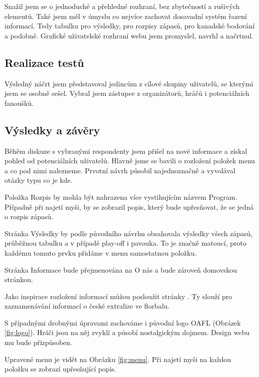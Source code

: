 \documentclass[11pt, a4paper, titlepage]{article}
\begin{document}
Snažil jsem se o jednoduché a přehledné rozhraní, bez zbytečností a rušivých elementů. Také jsem měl v úmyslu co nejvíce zachovat dosavadní systém řazení informací. Tedy tabulku pro výsledky, pro rozpisy zápasů, pro kanadské bodování a podobně. Grafické uživatelské rozhraní webu jsem promyslel, navrhl a načrtnul.

\subsection{Realizace testů}

Výsledný náčrt jsem představoval jedincům z cílové skupiny uživatelů, se kterými jsem se osobně sešel. Vybral jsem zástupce z organizátorů, hráčů i potenciálních fanoušků.

\subsection{Výsledky a závěry}

Běhěm diskuze s vybranými respondenty jsem přišel na nové informace a získal pohled od potenciálních uživatelů. Hlavně jsme se bavili o rozložení položek menu a co pod nimi nalezneme. Prvotní návrh působil najednoznačně a vyvolával otázky typu co je kde.
\medskip

Položka Rozpis by mohla být nahrazena více vystihujícím názvem Program. Případně při najetí myši, by se zobrazil popis, který bude upřesňovat, že se jedná o rozpis zápasů.
\medskip

Stránka Výsledky by podle původního návrhu obsahovala výsledky všech zápasů, průběžnou tabulku a v případě play-off i pavouka. To je značně matoucí, proto každému tomuto prvku přidáme v menu samostatnou položku.
\medskip

Stránka Informace bude přejmenována na O nás a bude zároveň domovskou stránkou.
\medskip

Jako inspirace rozložení informací můžou posloužit stránky . Ty slouží pro zaznamenávání informací o české extralize ve florbalu.
\medskip

S případnými drobnými úpravami zachováme i původní logo OAFL (Obrázek \ref{fig:logo}). Hráči jsou na něj zvyklí a působí nostalgickým dojmem. Design webu mu bude přizpůsoben.
\medskip

Upravené menu je vidět na Obrázku \ref{fig:menu}. Při najetí myši na každou položku se zobrazí upřesňující popis.
\end{document}
